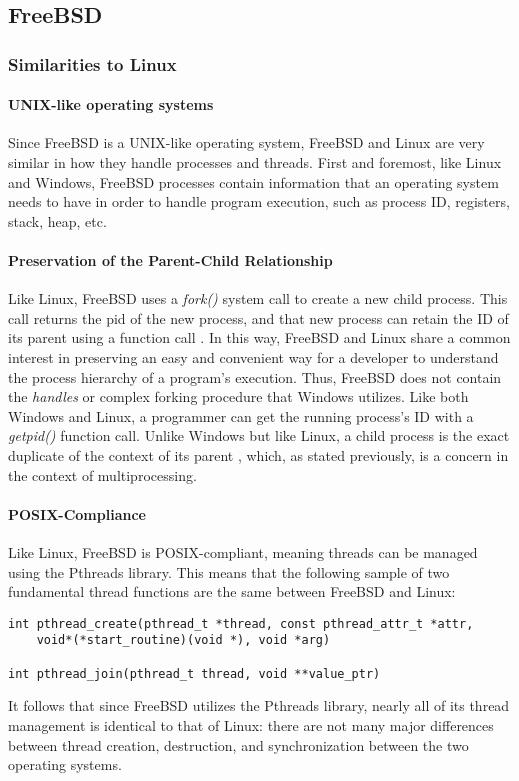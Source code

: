 \documentclass[letterpaper,10pt,titlepage]{article}
\begin{document}
\subsection{FreeBSD}
% 
%
%

\subsubsection{Similarities to Linux}
\paragraph{UNIX-like operating systems}
Since FreeBSD is a UNIX-like operating system, FreeBSD and Linux are very similar in how they handle processes and threads. First and foremost, like Linux and Windows, FreeBSD processes contain information that an operating system needs to have in order to handle program execution, such as process ID, registers, stack, heap, etc. 
\paragraph{Preservation of the Parent-Child Relationship} 
Like Linux, FreeBSD uses a \emph{fork()} system call to create a new child process. This call returns the pid of the new process, and that new process can retain the ID of its parent using a function call \cite{mck15}. In this way, FreeBSD and Linux share a common interest in preserving an easy and convenient way for a developer to understand the process hierarchy of a program's execution. Thus, FreeBSD does not contain the \emph{handles} or complex forking procedure that Windows utilizes. Like both Windows and Linux, a programmer can get the running process's ID with a \emph{getpid()} function call. Unlike Windows but like Linux, a child process is the exact duplicate of the context of its parent \cite{mck15}, which, as stated previously, is a concern in the context of multiprocessing.
\paragraph{POSIX-Compliance}
Like Linux, FreeBSD is POSIX-compliant, meaning threads can be managed using the Pthreads library. This means that the following sample of two fundamental thread functions are the same between FreeBSD and Linux:
\begin{lstlisting}
int pthread_create(pthread_t *thread, const pthread_attr_t *attr, 
	void*(*start_routine)(void *), void *arg)

int pthread_join(pthread_t thread, void **value_ptr)
\end{lstlisting}
It follows that since FreeBSD utilizes the Pthreads library, nearly all of its thread management is identical to that of Linux: there are not many major differences between thread creation, destruction, and synchronization between the two operating systems.
\end{document}
